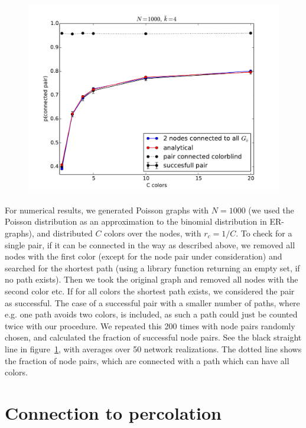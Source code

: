 \documentclass[aps, pre, onecolumn, a4paper, floatfix]{revtex4}
\begin{document}
\begin{figure}[htb]
\begin{center}
	\includegraphics[width=0.6\columnwidth]{finder_C.pdf}
	\caption{}
	\label{fig:model}
\end{center}
\end{figure}
%
For numerical results, we generated Poisson graphs with $N=1000$ (we used the 
Poisson distribution as an approximation to the binomial distribution in 
ER-graphs), and distributed $C$ colors over the nodes, with $r_c=1/C$. 
To check for a single pair, if it can be connected in 
the way as described above, we removed all nodes with the first color (except for 
the node pair under consideration) and 
searched for the shortest path (using a library function returning an empty set, 
if no path exists). Then we took the original graph and removed all nodes with the 
second color etc. If for all colors the shortest path exists, we considered the 
pair as successful. The case of a successful pair with a smaller number of 
paths, where e.g. one path avoids two colors, is included, as such a path could 
just be counted twice with our procedure. We repeated this 200 times with node pairs 
randomly chosen, and calculated the fraction of successful node pairs. See the black 
straight line in figure~\ref{fig:model}, with averages over 50 network realizations. The dotted 
line shows the fraction of node pairs, which are connected with a path which can 
have all colors. 



\section*{Connection to percolation}
\end{document}
